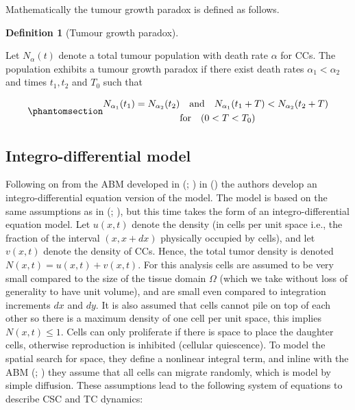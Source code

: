 \documentclass[
  letterpaper,
]{scrreprt}
\theoremstyle{definition}
\newtheorem{definition}{Definition}[chapter]
\theoremstyle{remark}
\begin{document}
Mathematically the tumour growth paradox is defined as follows.

\begin{definition}[Tumour growth
paradox]\protect\hypertarget{def-tumor-growth-paradox}{}\label{def-tumor-growth-paradox}

Let \(N_\alpha (t)\) denote a total tumour population with death rate
\(\alpha\) for CCs. The population exhibits a tumour growth paradox if
there exist death rates \(\alpha_1 < \alpha_2\) and times \(t_1,t_2\)
and \(T_0\) such that

\begin{equation}\phantomsection\label{eq-tumour-growth-paradox}{
\begin{aligned}
N_{\alpha_1}(t_1) = N_{\alpha_2}(t_2)& \quad \text{and} \quad N_{\alpha_1}(t_1 + T) < N_{\alpha_2}(t_2 + T) \\
&\text{for} \quad (0<T<T_0) 
\end{aligned}
}\end{equation}

\end{definition}

\subsection{Integro-differential
model}\label{sec-integro-differential-model}

Following on from the ABM developed in
(;
) in
() the
authors develop an integro-differential equation version of the model.
The model is based on the same assumptions as in
(;
), but this time takes the form
of an integro-differential equation model. Let \(u(x,t)\) denote the
density (in cells per unit space i.e., the fraction of the interval
\((x,x+dx)\) physically occupied by cells), and let \(v(x,t)\) denote
the density of CCs. Hence, the total tumor density is denoted
\(N(x,t) = u(x,t) + v(x,t)\). For this analysis cells are assumed to be
very small compared to the size of the tissue domain \(\Omega\) (which
we take without loss of generality to have unit volume), and are small
even compared to integration increments \(dx\) and \(dy\). It is also
assumed that cells cannot pile on top of each other so there is a
maximum density of one cell per unit space, this implies
\(N(x,t) \leq 1\). Cells can only proliferate if there is space to place
the daughter cells, otherwise reproduction is inhibited (cellular
quiescence). To model the spatial search for space, they define a
nonlinear integral term, and inline with the ABM
(;
) they assume that all cells can
migrate randomly, which is model by simple diffusion. These assumptions
lead to the following system of equations to describe CSC and TC
dynamics:
\end{document}
